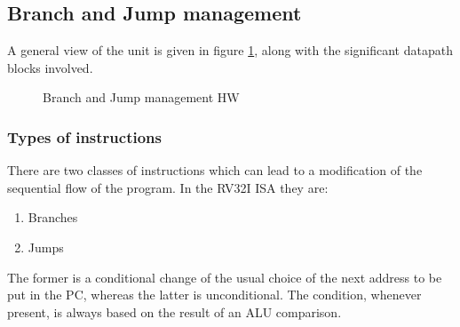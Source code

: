 \documentclass[a4paper]{article}
\begin{document}
\subsection{Branch and Jump management}
A general view of the unit is given in figure \ref{fig:brJump_man_HW}, along with the significant datapath blocks involved.

\begin{figure}[hbtp]
    \centering
    \caption{Branch and Jump management HW}
    \label{fig:brJump_man_HW}
\end{figure}

\subsubsection{Types of instructions}
There are two classes of instructions which can lead to a modification of the sequential flow of the program. In the RV32I ISA they are:
\begin{enumerate}
	\item Branches
	\item Jumps
\end{enumerate}
The former is a conditional change of the usual choice of the next address to be put in the PC, whereas the latter is unconditional. The condition, whenever present, is always based on the result of an ALU comparison.
\end{document}
